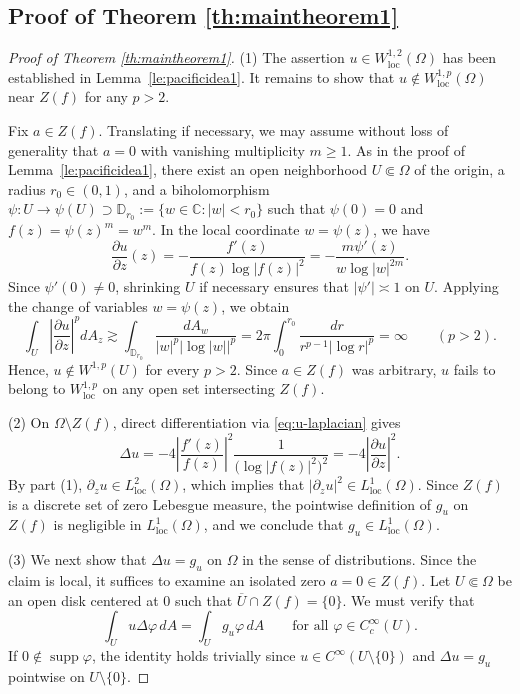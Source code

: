 \documentclass[12pt,twoside]{amsart}
\numberwithin{equation}{section}
\numberwithin{definition}{section} %
\begin{document}
\subsection{Proof of Theorem \ref{th:maintheorem1}}

\begin{proof}[Proof of Theorem \ref{th:maintheorem1}]
(1) The assertion $u \in W^{1,2}_{\mathrm{loc}}(\Omega)$ has been established in Lemma~\ref{le:pacificidea1}. It remains to show that $u \notin W_{\mathrm{loc}}^{1,p}(\Omega)$ near $Z(f)$ for any $p > 2$. 

Fix $a \in Z(f)$. Translating if necessary, we may assume without loss of generality that $a = 0$ with vanishing multiplicity $m \ge 1$. As in the proof of Lemma~\ref{le:pacificidea1}, there exist an open neighborhood $U \Subset \Omega$ of the origin, a radius $r_0 \in (0, 1)$, and a biholomorphism $\psi \colon U \to \psi(U) \supset \mathbb{D}_{r_0} := \{w \in \mathbb{C} : |w| < r_0\}$ such that $\psi(0) = 0$ and $f(z) = \psi(z)^m = w^m$. In the local coordinate $w = \psi(z)$, we have
\[
\frac{\partial u}{\partial z}(z) = -\frac{f'(z)}{f(z) \log|f(z)|^2} = -\frac{m \psi'(z)}{w \log|w|^{2m}}.
\]
Since $\psi'(0) \neq 0$, shrinking $U$ if necessary ensures that $|\psi'| \asymp 1$ on $U$. Applying the change of variables $w = \psi(z)$, we obtain
\begin{equation}\label{eq:u-W1p-divergence}
\int_U \left| \frac{\partial u}{\partial z} \right|^p dA_z \gtrsim \int_{\mathbb{D}_{r_0}} \frac{dA_w}{|w|^p |\log|w||^p} = 2\pi \int_0^{r_0} \frac{dr}{r^{p-1} |\log r|^p} = \infty \qquad (p > 2).
\end{equation}
Hence, $u \notin W^{1,p}(U)$ for every $p > 2$. Since $a \in Z(f)$ was arbitrary, $u$ fails to belong to $W^{1,p}_{\mathrm{loc}}$ on any open set intersecting $Z(f)$.

\medskip
\noindent (2) On $\Omega \setminus Z(f)$, direct differentiation via \eqref{eq:u-laplacian} gives
\[
\Delta u = -4 \left| \frac{f'(z)}{f(z)} \right|^2 \frac{1}{\bigl(\log|f(z)|^2\bigr)^2} = -4 \left| \frac{\partial u}{\partial z} \right|^2.
\]
By part (1), $\partial_z u \in L^2_{\mathrm{loc}}(\Omega)$, which implies that $|\partial_z u|^2 \in L^1_{\mathrm{loc}}(\Omega)$. Since $Z(f)$ is a discrete set of zero Lebesgue measure, the pointwise definition of $g_u$ on $Z(f)$ is negligible in $L^1_{\mathrm{loc}}(\Omega)$, and we conclude that $g_u \in L_{\mathrm{loc}}^1(\Omega)$.

\medskip
\noindent (3) We next show that $\Delta u = g_u$ on $\Omega$ in the sense of distributions. Since the claim is local, it suffices to examine an isolated zero $a = 0 \in Z(f)$. Let $U \Subset \Omega$ be an open disk centered at $0$ such that $\overline{U} \cap Z(f) = \{0\}$. We must verify that
\begin{equation}\label{eq:theo1-3}
\int_U u \Delta \varphi \, dA = \int_U g_u \varphi \, dA \qquad \text{for all } \varphi \in C_c^\infty(U).
\end{equation}
If $0 \notin \operatorname{supp} \varphi$, the identity holds trivially since $u \in C^\infty(U \setminus \{0\})$ and $\Delta u = g_u$ pointwise on $U \setminus \{0\}$. 


\end{proof}
\end{document}
